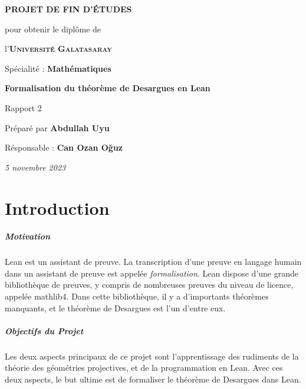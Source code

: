 \documentclass[12pt, oneside]{memoir}
\makeatletter
\newcommand\iraggedright{%
  \let\\\@centercr\@rightskip\@flushglue \rightskip\@rightskip
  \leftskip\z@skip}
\theoremstyle{definition}
\theoremstyle{remark}
\makeatother
\begin{document}
\thispagestyle{empty}
\begin{center}
  \vspace*{\fill}
  

  \vspace{1cm}
  \large{\textbf{PROJET DE FIN D'ÉTUDES}}

  \vspace{0.5cm}
  {\small pour obtenir le diplôme de}

  \vspace{0.5cm}
  l'\textsc{\textbf{Université Galatasaray}}

  {\small Spécialité : \textbf{Mathématiques}}

  \vspace{2.25cm}
  {\Large\textbf{Formalisation du théorème de Desargues en Lean}}

  Rapport 2

  \vspace{1.25cm}
  Préparé par \textbf{Abdullah Uyu}

  Résponsable : \textbf{Can Ozan Oğuz}

  \vspace{2.25cm}
  \textit{5 novembre 2023}
  \vspace*{\fill}
\end{center}
\clearpage
\tableofcontents
\iraggedright
{}
\chapter{Introduction}
\paragraph{Motivation}
Lean est un assistant de preuve. La transcription d'une preuve en
langage humain dans un assistant de preuve est appelée
\textit{formalisation}. Lean dispose d'une grande bibliothèque de
preuves, y compris de nombreuses preuves du niveau de licence, appelée
mathlib4. Dans cette bibliothèque, il y a d'importants théorèmes
manquants, et le théorème de Desargues est l'un d'entre eux.
\paragraph{Objectifs du Projet}
Les deux aspects principaux de ce projet sont l'apprentissage des
rudiments de la théorie des géométries projectives, et de la
programmation en Lean. Avec ces deux aspects, le but ultime est de
formaliser le théorème de Desargues dans Lean.
\end{document}
